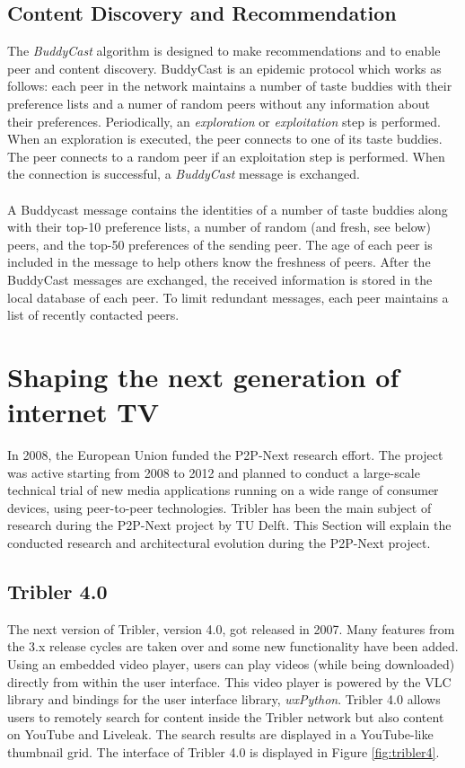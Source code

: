 \subsection{Content Discovery and Recommendation}
The \emph{BuddyCast} algorithm is designed to make recommendations and to enable peer and content discovery. BuddyCast is an epidemic protocol which works as follows: each peer in the network maintains a number of taste buddies with their preference lists and a numer of random peers without any information about their preferences. Periodically, an \emph{exploration} or \emph{exploitation} step is performed. When an exploration is executed, the peer connects to one of its taste buddies. The peer connects to a random peer if an exploitation step is performed. When the connection is successful, a \emph{BuddyCast} message is exchanged.\\\\
A Buddycast message contains the identities of a number of taste buddies along with their top-10 preference lists, a number of random (and fresh, see below) peers, and the top-50 preferences of the sending peer. The age of each peer is included in the message to help others know the freshness of peers. After the BuddyCast messages are exchanged, the received information is stored in the local database of each peer. To limit redundant messages, each peer maintains a list of recently contacted peers.

\section{Shaping the next generation of internet TV}
In 2008, the European Union funded the P2P-Next research effort\cite{p2pnextpressrelease}. The project was active starting from 2008 to 2012 and planned to conduct a large-scale technical trial of new media applications running on a wide range of consumer devices, using peer-to-peer technologies. Tribler has been the main subject of research during the P2P-Next project by TU Delft. This Section will explain the conducted research and architectural evolution during the P2P-Next project.

\subsection{Tribler 4.0}
The next version of Tribler, version 4.0, got released in 2007\cite{tribler4tf}. Many features from the 3.x release cycles are taken over and some new functionality have been added. Using an embedded video player, users can play videos (while being downloaded) directly from within the user interface. This video player is powered by the VLC library and bindings for the user interface library, \emph{wxPython}. Tribler 4.0 allows users to remotely search for content inside the Tribler network but also content on YouTube and Liveleak. The search results are displayed in a YouTube-like thumbnail grid. The interface of Tribler 4.0 is displayed in Figure \ref{fig:tribler4}.

